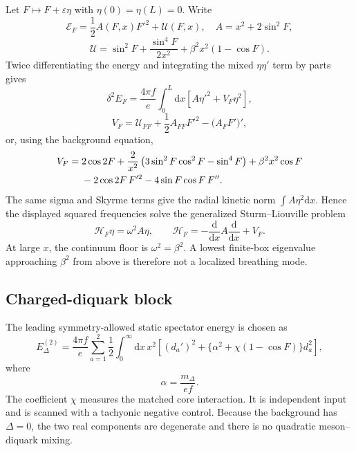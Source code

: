 \documentclass[11pt]{article}
\theoremstyle{definition}
\theoremstyle{remark}
\newcommand{\dd}{\mathrm d}
\newcommand{\cE}{\mathcal E}
\newcommand{\cH}{\mathcal H}
\newcommand{\cU}{\mathcal U}
\begin{document}
Let \(F\mapsto F+\varepsilon\eta\) with
\(\eta(0)=\eta(L)=0\).  Write
\begin{equation}
 \cE_F=\frac12A(F,x)F'^2+\cU(F,x),\quad
 A=x^2+2\sin^2F,
\end{equation}
\begin{equation}
 \cU=\sin^2F+\frac{\sin^4F}{2x^2}
 +\beta^2x^2(1-\cos F).
\end{equation}
Twice differentiating the energy and integrating the mixed
\(\eta\eta'\) term by parts gives
\begin{equation}
 \delta^2E_F=\frac{4\pi f}{e}\int_0^L\dd x
 \left[A\eta'^2+V_F\eta^2\right],
 \label{eq:radial-second-variation}
\end{equation}
\begin{equation}
 V_F=\cU_{FF}+\frac12A_{FF}F'^2-\bigl(A_F F'\bigr)',
 \label{eq:VF-abstract}
\end{equation}
or, using the background equation,
\begin{align}
 V_F={}&2\cos2F
 +\frac{2}{x^2}\left(3\sin^2F\cos^2F-\sin^4F\right)
 +\beta^2x^2\cos F \notag\\
 &-2\cos2F\,F'^2-4\sin F\cos F\,F''.
 \label{eq:VF-explicit}
\end{align}
The same sigma and Skyrme terms give the radial kinetic norm
\(\int A\eta^2\dd x\).  Hence the displayed squared frequencies solve the
generalized Sturm--Liouville problem
\begin{equation}
 \cH_F\eta=\omega^2A\eta,\qquad
 \cH_F=-\frac{\dd}{\dd x}A\frac{\dd}{\dd x}+V_F.
 \label{eq:radial-generalized}
\end{equation}
At large \(x\), the continuum floor is \(\omega^2=\beta^2\).  A lowest
finite-box eigenvalue approaching \(\beta^2\) from above is therefore not a
localized breathing mode.

\subsection{Charged-diquark block}

The leading symmetry-allowed static spectator energy is chosen as
\begin{equation}
 E_\Delta^{(2)}
 =\frac{4\pi f}{e}\sum_{a=1}^2\frac12
 \int_0^\infty\dd x\,x^2
 \left[(d_a')^2+
 \{\alpha^2+\chi(1-\cos F)\}d_a^2\right],
 \label{eq:diquark-quadratic}
\end{equation}
where
\begin{equation}
 \alpha=\frac{m_\Delta}{ef}.
\end{equation}
The coefficient \(\chi\) measures the matched core interaction.  It is
independent input and is scanned with a tachyonic negative control.  Because
the background has \(\Delta=0\), the two real components are degenerate and
there is no quadratic meson--diquark mixing.
\end{document}
